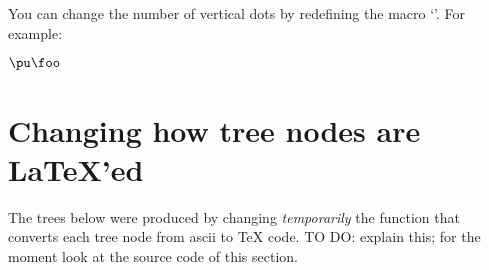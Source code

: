 \documentclass[oneside]{article}
\def\msk{\medskip}
\begin{document}
You can change the number of vertical dots by redefining the macro
`\co{\\DeduceSym}'. For example:

\msk

%
%
$\pu\foo$




%                                                 
\section{Changing how tree nodes are \LaTeX'ed}

The trees below were produced by changing {\sl temporarily} the
function that converts each tree node from ascii to \TeX{} code. TO
DO: explain this; for the moment look at the source code of this
section.





\end{document}
